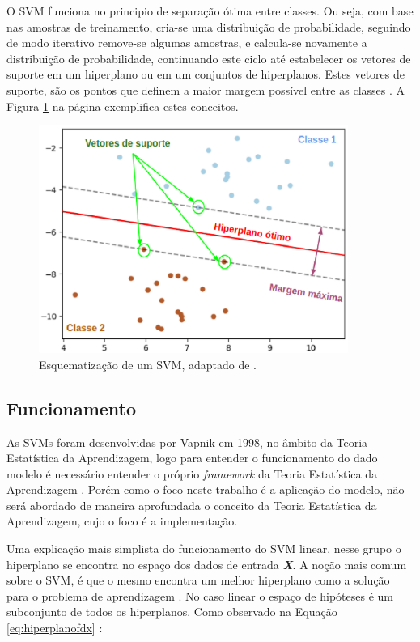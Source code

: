  O SVM funciona no principio de separação ótima entre classes. Ou seja, com base nas amostras de treinamento, cria-se uma distribuição de probabilidade, seguindo de modo iterativo remove-se algumas amostras, e calcula-se novamente a distribuição de probabilidade, continuando este ciclo até estabelecer os vetores de suporte em um hiperplano ou em um conjuntos de hiperplanos. Estes vetores de suporte, são os pontos que definem a maior margem possível entre as classes \cite{huang2002assessment}. A Figura \ref{svm_hiperplano} na página \pageref{svm_hiperplano} exemplifica estes conceitos.

 \begin{figure}[!htb]
     \centering
     \includegraphics[width=0.9\textwidth]{figuras/svm_hiperplano.eps}
     \caption{Esquematização de um SVM, adaptado de .}
     \label{svm_hiperplano}
 \end{figure}

 \subsection{Funcionamento}

As SVMs foram desenvolvidas por Vapnik em 1998, no âmbito da Teoria Estatística da Aprendizagem, logo para entender o funcionamento do dado modelo é necessário entender o próprio \textit{framework} da Teoria Estatística da Aprendizagem \cite{vapnik1998statistical}. Porém como o foco neste trabalho é a aplicação do modelo, não será abordado de maneira aprofundada o conceito da Teoria Estatística da Aprendizagem, cujo o foco é a implementação.
 
Uma explicação mais simplista do funcionamento do SVM linear, nesse grupo o hiperplano se encontra no espaço dos dados de entrada \textbf{\textit{X}}. A noção mais comum sobre o SVM, é que o mesmo encontra um melhor hiperplano como a solução para o problema de aprendizagem \cite{vapnik1998statistical}. No caso linear o espaço de hipóteses é um subconjunto de todos os hiperplanos. Como observado na Equação \ref{eq:hiperplanofdx} \cite{evgeniou1999support}:

